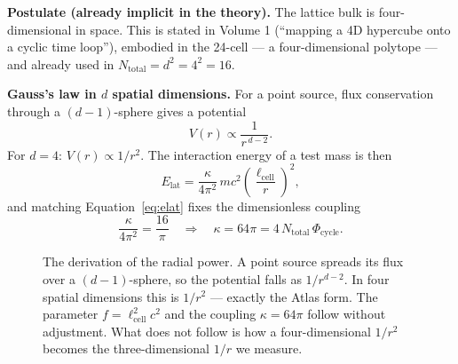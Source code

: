 \documentclass[11pt, letterpaper, openany]{book}
\begin{document}
\begin{signalbox}
\textbf{Postulate (already implicit in the theory).} The lattice bulk is four-dimensional in
space. This is stated in Volume 1 (``mapping a 4D hypercube onto a cyclic time loop''), embodied
in the 24-cell --- a four-dimensional polytope --- and already used in $N_{\mathrm{total}} =
d^2 = 4^2 = 16$.

\medskip
\textbf{Gauss's law in $d$ spatial dimensions.} For a point source, flux conservation through a
$(d-1)$-sphere gives a potential
\[
V(r) \propto \frac{1}{r^{\,d-2}} .
\]
For $d = 4$: $V(r) \propto 1/r^2$. The interaction energy of a test mass is then
\[
E_{\mathrm{lat}} = \frac{\kappa}{4\pi^2}\, m c^2 \left(\frac{\ell_{\mathrm{cell}}}{r}\right)^2 ,
\]
and matching Equation~\ref{eq:elat} fixes the dimensionless coupling
\[
\frac{\kappa}{4\pi^2} = \frac{16}{\pi} \quad\Longrightarrow\quad
\kappa = 64\pi = 4\,N_{\mathrm{total}}\,\Phi_{\mathrm{cycle}} .
\]
\end{signalbox}

\begin{figure}[H]
\centering
{}
\caption{The derivation of the radial power. A point source spreads its flux over a
$(d-1)$-sphere, so the potential falls as $1/r^{d-2}$. In four spatial dimensions this is
$1/r^2$ --- exactly the Atlas form. The parameter $f = \ell_{\mathrm{cell}}^2 c^2$ and the
coupling $\kappa = 64\pi$ follow without adjustment. What does not follow is how a
four-dimensional $1/r^2$ becomes the three-dimensional $1/r$ we measure.}
\end{figure}
\end{document}

